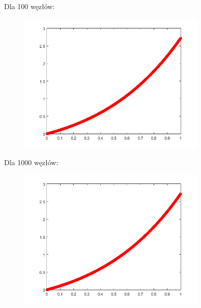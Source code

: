 \newpage
\begin{samepage}
	
	Dla 100 węzłów:
	\begin{figure}[!ht]
		\begin{center}
			\includegraphics[width=0.8\textwidth]{Lab4/charts/zad4/3/100.png}
		\end{center}
	\end{figure}
	\FloatBarrier
\end{samepage}

\begin{samepage}
	Dla 1000 węzłów:
	
	\begin{figure}[!ht]
		\begin{center}
			\includegraphics[width=0.8\textwidth]{Lab4/charts/zad4/3/1000.png}
		\end{center}
	\end{figure}
	\FloatBarrier
\end{samepage}    

